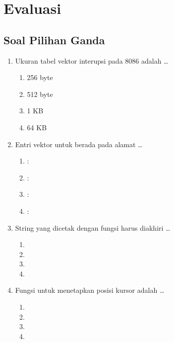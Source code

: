 \section{Evaluasi}
\label{sec:evaluasi-bab9}

\subsection{Soal Pilihan Ganda}

\begin{enumerate}
    \item Ukuran tabel vektor interupsi pada 8086 adalah \dots
          \begin{enumerate}
              \item 256 byte \item 512 byte
              \item 1 KB \item 64 KB
          \end{enumerate}

    \item Entri vektor untuk  berada pada alamat
          \dots
          \begin{enumerate}
              \item {}:
              \item {}:
              \item {}:
              \item {}:
          \end{enumerate}

    \item String yang dicetak dengan  fungsi 
          harus diakhiri \dots
          \begin{enumerate}
              \item {} \item {}
              \item {} \item {}
          \end{enumerate}

    \item Fungsi  untuk menetapkan posisi kursor
          adalah \dots
          \begin{enumerate}
              \item {} \item {}
              \item {} \item {}
          \end{enumerate}


\end{enumerate}
